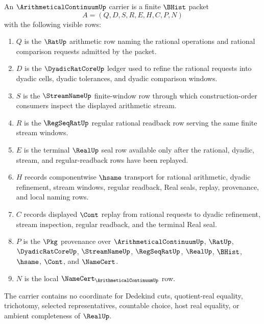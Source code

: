\begin{definition}
\label{def:arithmetical-continuum-carrier}
An $\ArithmeticalContinuumUp$ carrier is a finite $\BHist$ packet
$$
A=(Q,D,S,R,E,H,C,P,N)
$$
with the following visible rows:
\begin{enumerate}
\item $Q$ is the $\RatUp$ arithmetic row naming the rational operations and rational comparison requests admitted by the packet.
\item $D$ is the $\DyadicRatCoreUp$ ledger used to refine the rational requests into dyadic cells, dyadic tolerances, and dyadic comparison windows.
\item $S$ is the $\StreamNameUp$ finite-window row through which construction-order consumers inspect the displayed arithmetic stream.
\item $R$ is the $\RegSeqRatUp$ regular rational readback row serving the same finite stream windows.
\item $E$ is the terminal $\RealUp$ seal row available only after the rational, dyadic, stream, and regular-readback rows have been replayed.
\item $H$ records componentwise $\hsame$ transport for rational arithmetic, dyadic refinement, stream windows, regular readback, Real seals, replay, provenance, and local naming rows.
\item $C$ records displayed $\Cont$ replay from rational requests to dyadic refinement, stream inspection, regular readback, and the terminal Real seal.
\item $P$ is the $\Pkg$ provenance over $\ArithmeticalContinuumUp$, $\RatUp$, $\DyadicRatCoreUp$, $\StreamNameUp$, $\RegSeqRatUp$, $\RealUp$, $\BHist$, $\hsame$, $\Cont$, and $\NameCert$.
\item $N$ is the local $\NameCert_{\ArithmeticalContinuumUp}$ row.
\end{enumerate}
The carrier contains no coordinate for Dedekind cuts, quotient-real equality, trichotomy, selected representatives, countable choice, host real equality, or ambient completeness of $\RealUp$.
\end{definition}

